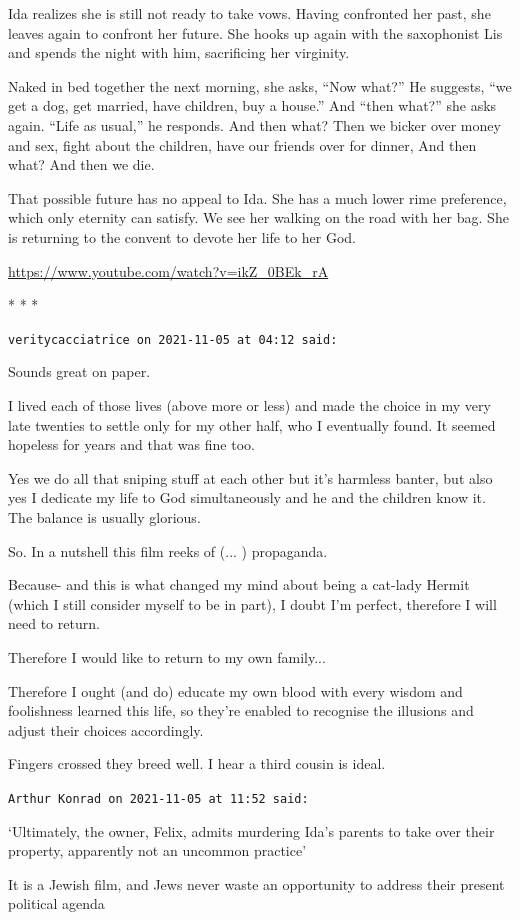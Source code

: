 Ida realizes she is still not ready to take vows. Having confronted her past, she leaves again to confront her future. She hooks up again with the saxophonist Lis and spends the night with him, sacrificing her virginity.

Naked in bed together the next morning, she asks, ``Now what?'' He suggests, ``we get a dog, get married, have children, buy a house.'' And ``then what?'' she asks again. ``Life as usual,'' he responds. And then what? Then we bicker over money and sex, fight about the children, have our friends over for dinner, And then what? And then we die.

That possible future has no appeal to Ida. She has a much lower rime preference, which only eternity can satisfy. We see her walking on the road with her bag. She is returning to the convent to devote her life to her God.

\url{https://www.youtube.com/watch?v=ikZ\_0BEk\_rA}


\begin{center}* * *\end{center}

\begin{footnotesize}
\begin{sffamily}
\texttt{veritycacciatrice on 2021-11-05 at 04:12 said:}

Sounds great on paper.

I lived each of those lives (above more or less) and made the choice in my very late twenties to settle only for my other half, who I eventually found. It seemed hopeless for years and that was fine too.

Yes we do all that sniping stuff at each other but it's harmless banter, but also yes I dedicate my life to God simultaneously and he and the children know it. The balance is usually glorious.

So. In a nutshell this film reeks of (... ) propaganda.

Because- and this is what changed my mind about being a cat-lady Hermit (which I still consider myself to be in part), I doubt I'm perfect, therefore I will need to return.

Therefore I would like to return to my own family... 

Therefore I ought (and do) educate my own blood with every wisdom and foolishness learned this life, so they're enabled to recognise the illusions and adjust their choices accordingly.

Fingers crossed they breed well. I hear a third cousin is ideal.

\hfill

\texttt{Arthur Konrad on 2021-11-05 at 11:52 said:}

`Ultimately, the owner, Felix, admits murdering Ida's parents to take over their property, apparently not an uncommon practice'

It is a Jewish film, and Jews never waste an opportunity to address their present political agenda


\hfill

\end{sffamily}
\end{footnotesize}

